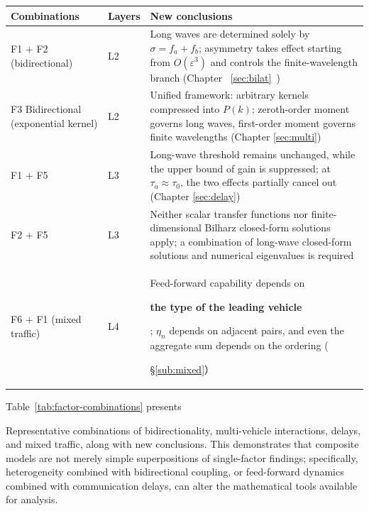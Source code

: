 \documentclass[11pt,a4paper,openany]{book}
\numberwithin{equation}{chapter}
\numberwithin{figure}{chapter}
\numberwithin{table}{chapter}
\newcommand{\tabletext}[2]{%
  \par\smallskip\noindent
  Table~\ref{#1} presents #2
\par\smallskip
}
\begin{document}
\begin{center}
\small
{}
\label{tab:factor-combinations}
\begin{tabular}{p{3.8cm}p{2.0cm}p{7.4cm}}
\toprule
\textbf{Combinations} & \textbf{Layers} & \textbf{New conclusions} \\
\midrule







F1 $+$ F2 (bidirectional)




& L2 &




Long waves are determined solely by $\sigma=f_a+f_b$; asymmetry takes effect starting from $O(\varepsilon^3)$ and controls the finite-wavelength branch (Chapter ~\ref{sec:bilat}~)




\\[6pt]
F3 Bidirectional (exponential kernel)

& L2 &

Unified framework: arbitrary kernels compressed into $P(k)$; zeroth-order moment governs long waves, first-order moment governs finite wavelengths (Chapter \ref{sec:multi})
\\[6pt]
F1 $+$ F5 & L3 &

Long-wave threshold remains unchanged, while the upper bound of gain is suppressed; at $\tau_a\approx\tau_0$, the two effects partially cancel out (Chapter \ref{sec:delay})
\\[6pt]
F2 $+$ F5 & L3 &

Neither scalar transfer functions nor finite-dimensional Bilharz closed-form solutions apply; a combination of long-wave closed-form solutions and numerical eigenvalues is required
\\[6pt]
F6 $+$ F1 (mixed traffic)

& L4 &

Feed-forward capability depends on

\textbf{the type of the leading vehicle}

; $\eta_n$ depends on adjacent pairs, and even the aggregate sum depends on the ordering (

\S\ref{sub:mixed}） \\
\bottomrule
\end{tabular}
\end{center}
\tabletext{tab:factor-combinations}{

Representative combinations of bidirectionality, multi-vehicle interactions, delays, and mixed traffic, along with new conclusions. This demonstrates that composite models are not merely simple superpositions of single-factor findings; specifically, heterogeneity combined with bidirectional coupling, or feed-forward dynamics combined with communication delays, can alter the mathematical tools available for analysis.}
\end{document}
